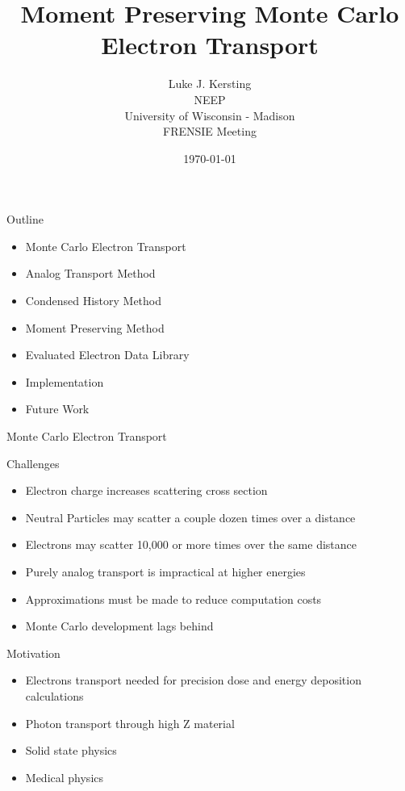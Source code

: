 \documentclass{beamer}
\author{Luke J. Kersting
    \\ NEEP
    \\ University of Wisconsin - Madison
    \\ FRENSIE Meeting
}
\date{\today}
\title{Moment Preserving Monte Carlo Electron Transport}
\begin{document}
\maketitle

\begin{frame}{Outline}

    \begin{itemize}
      \item Monte Carlo Electron Transport
      \item Analog Transport Method
      \item Condensed History Method
      \item Moment Preserving Method
      \item Evaluated Electron Data Library
      \item Implementation
      \item Future Work
    \end{itemize}

\end{frame}

\begin{frame}{Monte Carlo Electron Transport}

  \begin{block}{Challenges}
    \begin{itemize}
      \item Electron charge increases scattering cross section
      \item Neutral Particles may scatter a couple dozen times over a distance
      \item Electrons may scatter 10,000 or more times over the same distance
      \item Purely analog transport is impractical at higher energies
      \item Approximations must be made to reduce computation costs
      \item Monte Carlo development lags behind
    \end{itemize}
  \end{block}
    
  \begin{block}{Motivation}
    \begin{itemize}
      \item Electrons transport needed for precision dose and energy deposition calculations
      \item Photon transport through high Z material
      \item Solid state physics
      \item Medical physics
    \end{itemize}    
  \end{block}  

\end{frame}
\end{document}
